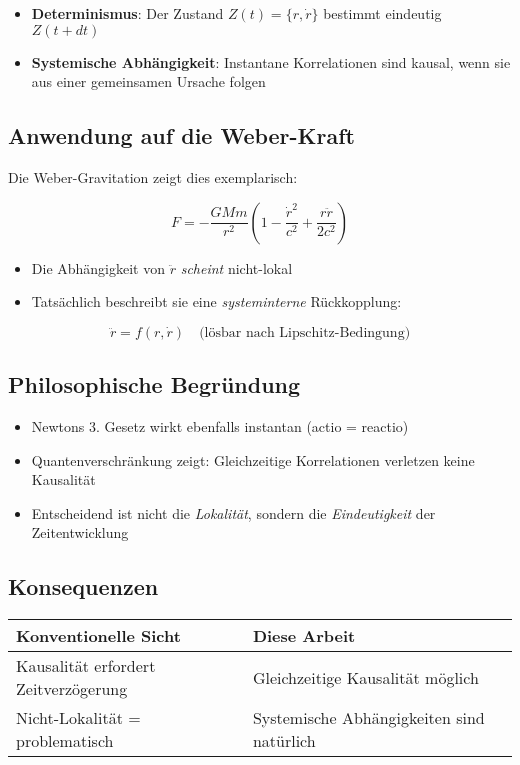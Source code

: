 \begin{itemize}
    \item \textbf{Determinismus}: Der Zustand $Z(t) = \{r, \dot{r}\}$ bestimmt eindeutig $Z(t+dt)$
    \item \textbf{Systemische Abhängigkeit}: Instantane Korrelationen sind kausal, wenn sie aus einer gemeinsamen Ursache folgen
\end{itemize}

\subsection{Anwendung auf die Weber-Kraft}
Die Weber-Gravitation zeigt dies exemplarisch:

\begin{equation}
    F = -\frac{GMm}{r^2}\left(1 - \frac{\dot{r}^2}{c^2} + \frac{r\ddot{r}}{2c^2}\right)
\end{equation}

\begin{itemize}
    \item Die Abhängigkeit von $\ddot{r}$ \textit{scheint} nicht-lokal
    \item Tatsächlich beschreibt sie eine \textit{systeminterne} Rückkopplung:
\end{itemize}

\begin{equation}
    \ddot{r} = f(r, \dot{r}) \quad \text{(lösbar nach Lipschitz-Bedingung)}
\end{equation}

\subsection{Philosophische Begründung}
\begin{itemize}
    \item Newtons 3. Gesetz wirkt ebenfalls instantan (actio = reactio)
    \item Quantenverschränkung zeigt: Gleichzeitige Korrelationen verletzen keine Kausalität
    \item Entscheidend ist nicht die \textit{Lokalität}, sondern die \textit{Eindeutigkeit} der Zeitentwicklung
\end{itemize}

\subsection{Konsequenzen}
\begin{tabular}{p{}p{}}
    \hline
    \textbf{Konventionelle Sicht} & \textbf{Diese Arbeit} \\
    \hline
    Kausalität erfordert Zeitverzögerung & Gleichzeitige Kausalität möglich \\
    Nicht-Lokalität = problematisch & Systemische Abhängigkeiten sind natürlich \\
    \hline
\end{tabular}

